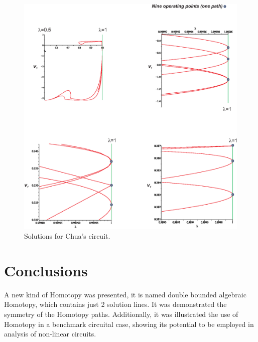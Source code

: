 \documentclass[conference,letterpaper,twocolumn]{IEEEtran}
\begin{document}
\begin{figure}[hbtp]
\centering
\includegraphics[scale=0.5]{fig/chuanew.eps}
\caption{Solutions for Chua's circuit.}
\label{chuaf}
\end{figure}



\section{Conclusions}

A new kind of Homotopy was presented, it is named double bounded algebraic Homotopy, which contains just 2 solution lines. It was demonstrated the symmetry of the Homotopy paths. 
Additionally, it was illustrated the use of Homotopy in a benchmark circuital case, showing its potential to be employed in analysis of non-linear circuits.



\end{document}
